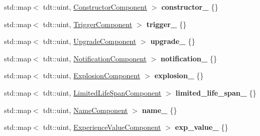 \begin{DoxyCompactItemize}
\item 
std\+::map$<$ tdt\+::uint, \hyperlink{struct_constructor_component}{Constructor\+Component} $>$ {\bfseries constructor\+\_\+} \{\}\hypertarget{class_entity_system_a3b4e8a7104f8d780d03ad396778bca35}{}\label{class_entity_system_a3b4e8a7104f8d780d03ad396778bca35}

\item 
std\+::map$<$ tdt\+::uint, \hyperlink{struct_trigger_component}{Trigger\+Component} $>$ {\bfseries trigger\+\_\+} \{\}\hypertarget{class_entity_system_a1bcbfa529cb6b5a0e25dbe47b95aec13}{}\label{class_entity_system_a1bcbfa529cb6b5a0e25dbe47b95aec13}

\item 
std\+::map$<$ tdt\+::uint, \hyperlink{struct_upgrade_component}{Upgrade\+Component} $>$ {\bfseries upgrade\+\_\+} \{\}\hypertarget{class_entity_system_a19161aaf1586365cf6f179f8f6764514}{}\label{class_entity_system_a19161aaf1586365cf6f179f8f6764514}

\item 
std\+::map$<$ tdt\+::uint, \hyperlink{struct_notification_component}{Notification\+Component} $>$ {\bfseries notification\+\_\+} \{\}\hypertarget{class_entity_system_a98941baea97e16f5e6c14af7b96a79aa}{}\label{class_entity_system_a98941baea97e16f5e6c14af7b96a79aa}

\item 
std\+::map$<$ tdt\+::uint, \hyperlink{struct_explosion_component}{Explosion\+Component} $>$ {\bfseries explosion\+\_\+} \{\}\hypertarget{class_entity_system_a292711b66097c087825ef39c7f9c7679}{}\label{class_entity_system_a292711b66097c087825ef39c7f9c7679}

\item 
std\+::map$<$ tdt\+::uint, \hyperlink{struct_limited_life_span_component}{Limited\+Life\+Span\+Component} $>$ {\bfseries limited\+\_\+life\+\_\+span\+\_\+} \{\}\hypertarget{class_entity_system_a0e91f19a3ba7c6e765db7c9875620e52}{}\label{class_entity_system_a0e91f19a3ba7c6e765db7c9875620e52}

\item 
std\+::map$<$ tdt\+::uint, \hyperlink{struct_name_component}{Name\+Component} $>$ {\bfseries name\+\_\+} \{\}\hypertarget{class_entity_system_a7ecaa860e8a072c5fb84cb1dc904cb0c}{}\label{class_entity_system_a7ecaa860e8a072c5fb84cb1dc904cb0c}

\item 
std\+::map$<$ tdt\+::uint, \hyperlink{struct_experience_value_component}{Experience\+Value\+Component} $>$ {\bfseries exp\+\_\+value\+\_\+} \{\}\hypertarget{class_entity_system_aea47838c7c7db6aef4eb5351553ba135}{}\label{class_entity_system_aea47838c7c7db6aef4eb5351553ba135}


\end{DoxyCompactItemize}
